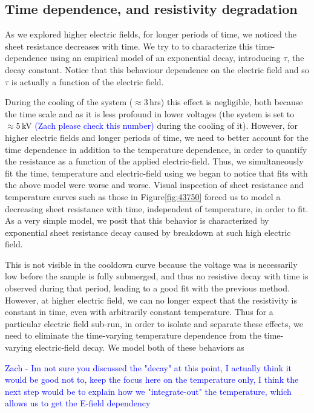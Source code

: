 \documentclass[a4paper,12pt]{article}
\newcommand{\RI}[1]{\textcolor{blue}{#1}}
\begin{document}
\subsection{Time dependence, and resistivity degradation}
\label{resdecayfit}


As we explored higher electric fields, for longer periods of time, we noticed the sheet resistance decreases with time. We try to to characterize this time-dependence using an empirical model of an exponential decay, introducing $\tau$, the decay constant. Notice that this behaviour dependence on the electric field and so $\tau$ is actually a function of the electric field.

During the cooling of the system ($\approx3$\,hrs) this effect is negligible, both because the time scale and as it is less profound in lower voltages (the system is set to $\approx5$\,kV \RI{(Zach please check this number)} during the cooling of it). However, for higher electric fields and longer periods of time, we need to better account for the time dependence in addition to the temperature dependence, in order to quantify the resistance as a function of the applied electric-field. Thus, we simultaneously fit the time, temperature and electric-field using
we began to notice that fits with the above model were worse and worse. Visual inspection of sheet resistance and temperature curves such as those in Figure\ref{fig:43750} forced us to model a decreasing sheet resistance with time, independent of temperature, in order to fit. As a very simple model, we posit that this behavior is characterized by exponential sheet resistance decay caused by breakdown at such high electric field. 

This is not visible in the cooldown curve because the voltage was is necessarily low before the sample is fully submerged, and thus no resistive decay with time is observed during that period, leading to a good fit with the previous method. However, at higher electric field, we can no longer expect that the resistivity is constant in time, even with arbitrarily constant temperature. Thus for a particular electric field sub-run, in order to isolate and separate these effects, we need to eliminate the time-varying temperature dependence from the time-varying electric-field decay. We model both of these behaviors as 

\RI{Zach - Im not sure you discussed the "decay" at this point, I actually think it would be good not to, keep the focus here on the temperature only, I think the next step would be to explain how we "integrate-out" the temperature, which allows us to get the E-field dependency}
\end{document}
